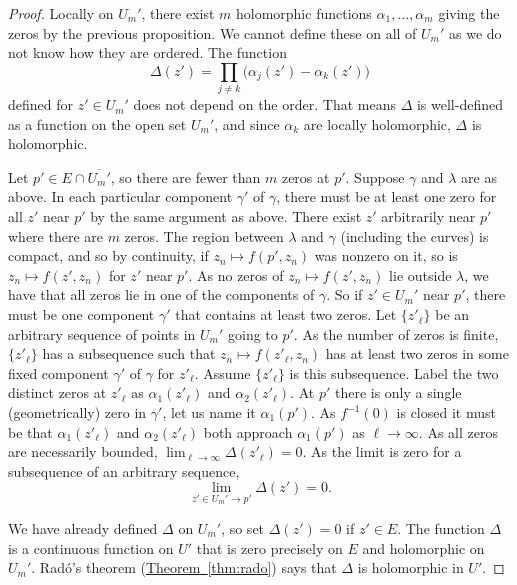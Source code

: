 \documentclass[12pt,openany]{book}
\theoremstyle{plain}
\theoremstyle{remark}
\theoremstyle{definition}
\theoremstyle{exercise}
\theoremstyle{example}
\newcommand{\thmref}[1]{\hyperref[#1]{Theorem~\ref*{#1}}}
\begin{document}
\begin{proof}
Locally on $U_m'$, there exist $m$ holomorphic functions
$\alpha_1, \ldots, \alpha_m$ giving the zeros by the previous proposition.
We cannot define these on all of $U_m'$ as we do not know how they are
ordered.
The function
\begin{equation*}
\Delta(z') = \prod_{j \not= k} \bigl( \alpha_j(z') - \alpha_k(z') \bigr)
\end{equation*}
defined for $z' \in U_m'$ does not depend on the order.
That means $\Delta$ is well-defined as a function on the open set $U_m'$,
and since $\alpha_k$ are locally holomorphic, $\Delta$ is holomorphic.

Let $p' \in E \cap \overline{U_m'}$,
so there are fewer than $m$ zeros at $p'$.
Suppose $\gamma$ and $\lambda$ are as above.
In each particular component $\gamma'$ of $\gamma$, there must
be at least one zero for all $z'$ near $p'$ by the same argument as above.
There exist $z'$ arbitrarily near $p'$ where there are $m$ zeros.
The region between $\lambda$ and $\gamma$ (including the curves) is compact,
and so by continuity,
if $z_n \mapsto f(p',z_n)$ was nonzero on it,
so is $z_n \mapsto f(z',z_n)$ for $z'$ near $p'$.
As no zeros of $z_n \mapsto f(z',z_n)$ lie outside $\lambda$,
we have that all
zeros lie in one of the components of $\gamma$.  So if $z' \in U_m'$ near
$p'$, there must be one
component $\gamma'$ that contains at least two zeros.  Let $\{ z'_\ell \}$
be an arbitrary sequence of points in $U_m'$ going to $p'$.
As the number of zeros is finite, $\{ z'_\ell \}$ has a
subsequence such that $z_n \mapsto f(z'_\ell,z_n)$ has at least two zeros in
some fixed component $\gamma'$ of $\gamma$ for $z'_\ell$.  Assume $\{ z'_\ell
\}$ is this subsequence.  Label the two distinct zeros at $z'_\ell$
as $\alpha_1(z'_\ell)$ and
$\alpha_2(z'_\ell)$.  At $p'$ there is only a single (geometrically) zero in $\gamma'$, let
us name it $\alpha_1(p')$.  As $f^{-1}(0)$ is closed it must be that
$\alpha_1(z'_\ell)$ and $\alpha_2(z'_\ell)$ both approach $\alpha_1(p')$ as
$\ell \to \infty$.
As all zeros are necessarily bounded,
$\lim_{\ell \to \infty} \Delta(z'_\ell) = 0$.  As the limit is zero for a
subsequence of an arbitrary sequence,
\begin{equation*}
\lim_{z' \in U_m' \to p'} \Delta(z') = 0 .
\end{equation*}

We have already defined $\Delta$ on $U_m'$, so set $\Delta(z') = 0$ if $z' \in E$.
The function $\Delta$ is a continuous function on $U'$ that is zero precisely on
$E$ and holomorphic on $U_m'$.
Rad{\'o}'s theorem
(\thmref{thm:rado}) says that $\Delta$ is holomorphic in $U'$.
\end{proof}
\end{document}

